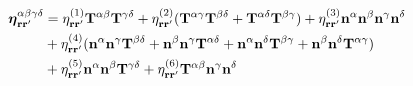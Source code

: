 \documentclass[b5paper,openright,10pt]{book}
\begin{document}
\begin{appendices}
\begin{align}
\boldsymbol{\eta}_{{\bf r}{\bf r}'}^{\alpha\beta\gamma\delta}  
&=
\eta^{(1)}_{{\bf r}{\bf r}'}{\bf T}^{\alpha\beta}{\bf T}^{\gamma\delta}
+\eta^{(2)}_{{\bf r}{\bf r}'}({\bf T}^{\alpha\gamma}{\bf T}^{\beta\delta}
+{\bf T}^{\alpha\delta}{\bf T}^{\beta\gamma}) +
\eta^{(3)}_{{\bf r}{\bf r}'} {\bf n}^\alpha  {\bf n}^\beta   {\bf n}^\gamma   {\bf n}^\delta 
\nonumber\\
&+\eta^{(4)}_{{\bf r}{\bf r}'}(
{\bf n}^\alpha  {\bf n}^\gamma {\bf T}^{\beta\delta}+ 
{\bf n}^\beta  {\bf n}^\gamma {\bf T}^{\alpha\delta}+ 
{\bf n}^\alpha  {\bf n}^\delta {\bf T}^{\beta\gamma}+ 
{\bf n}^\beta  {\bf n}^\delta {\bf T}^{\alpha\gamma}) 
\nonumber \\
&+\eta^{(5)}_{{\bf r}{\bf r}'}{\bf n}^\alpha  {\bf n}^\beta {\bf T}^{\gamma\delta} 
+\eta^{(6)}_{{\bf r}{\bf r}'}{\bf T}^{\alpha\beta} {\bf n}^\gamma  {\bf n}^\delta 
\label{viscosityTangential}
\end{align}
%
%

\end{appendices}
\end{document}
